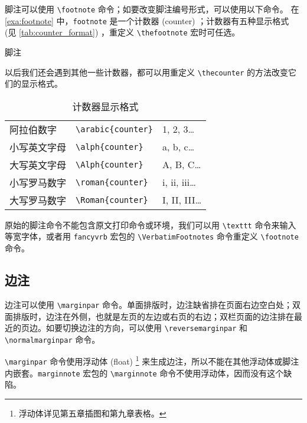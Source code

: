 脚注可以使用 \verb|\footnote| 命令；如要改变脚注编号形式，可以使用以下命令。
在 \autoref{exa:footnote} 中，\verb|footnote| 是一个计数器 (counter) ；计数器有五种显示格式 (见 \autoref{tab:counter_format}) ，重定义 \verb|\thefootnote| 宏时可任选。

\begin{example}[h]
\begin{Code}[numbers=left]
\renewcommand{\thefootnote}{\roman{footnote}} %
\end{Code}
\caption{脚注}
\label{exa:footnote}
\end{example}

以后我们还会遇到其他一些计数器，都可以用重定义 \verb|\thecounter| 的方法改变它们的显示格式。

\begin{table}
\centering
\caption{计数器显示格式}
\label{tab:counter_format}
\begin{tabular}{lll}
  \toprule
  阿拉伯数字 & \verb|\arabic{counter}| & 1, 2, 3\dots \\
  小写英文字母 & \verb|\alph{counter}| & a, b, c\dots \\
  大写英文字母 & \verb|\Alph{counter}| & A, B, C\dots \\
  小写罗马数字 & \verb|\roman{counter}| & i, ii, iii\dots \\
  大写罗马数字 & \verb|\Roman{counter}| & I, II, III\dots \\
  \bottomrule
\end{tabular}
\end{table}

原始的脚注命令不能包含原文打印命令或环境，我们可以用 \verb|\texttt| 命令来输入等宽字体，或者用 \texttt{fancyvrb} 宏包的 \verb|\VerbatimFootnotes| 命令重定义 \verb|\footnote| 命令。

\subsection{边注}

边注可以使用 \verb|\marginpar| 命令。单面排版时，边注缺省排在页面右边空白处；双面排版时，边注在外侧，也就是左页的左边或右页的右边；双栏页面的边注排在最近的页边。如要切换边注的方向，可以使用 \verb|\reversemarginpar| 和 \verb|\normalmarginpar| 命令。

\verb|\marginpar| 命令使用浮动体 (float) \footnote{浮动体详见第五章插图和第九章表格。} 来生成边注，所以不能在其他浮动体或脚注内嵌套。\texttt{marginnote} 宏包的 \verb|\marginnote| 命令不使用浮动体，因而没有这个缺陷。

